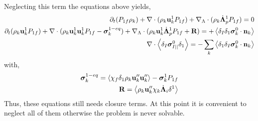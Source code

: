 Neglecting this term the equations above yields, 
\begin{align}
    \partial_t ( P_{1f} \rho_k )
    + \mathbf{\nabla}\cdot (
        \rho_k  \textbf{u}_k^1 P_{1f}
        )
    +  \mathbf{\nabla}_\Lambda \cdot ( \rho_k \dot{\bm\Lambda}_p^1 P_{1f})
    = 
    0 \\
    \partial_t (\rho_k \textbf{u}_k^1 P_{1f})
    + \mathbf{\nabla}\cdot (
         \rho_k \textbf{u}_k^1 \textbf{u}_k^1 P_{1f}
        - \bm\sigma_k^{1-eq}
        )
    +  \mathbf{\nabla}_\Lambda \cdot ( \rho_k \textbf{u}_k^1 \dot{\bm\Lambda}_p^1 P_{1f} + \textbf{R})
    = 
    + \left<\delta_I\delta_1
         \bm\sigma_k^0
    \cdot \textbf{n}_k\right>\\
        \mathbf{\nabla}\cdot \left<\delta_I \bm\sigma_{I||}^0 \delta_1 \right>
        = 
        - \sum_k\left<\delta_1
        \delta_I
        \bm\sigma_k^0
   \cdot \textbf{n}_k\right>
\end{align}
with, 
\begin{align}
    \bm\sigma_k^{1-eq}
    =
    \left<\chi_f \delta_1 \rho_k \textbf{u}''_k\textbf{u}''_k\right>
    - \bm\sigma_k^1 P_{1f}\\
    \textbf{R}
    = 
    \left<\rho_k \textbf{u}_k'' \chi_k \dot{\bm\Lambda}_i \delta^1\right>
\end{align}
Thus, these equations still needs closure terms. 
At this point it is convenient to neglect all of them otherwise the problem is never solvable. 

